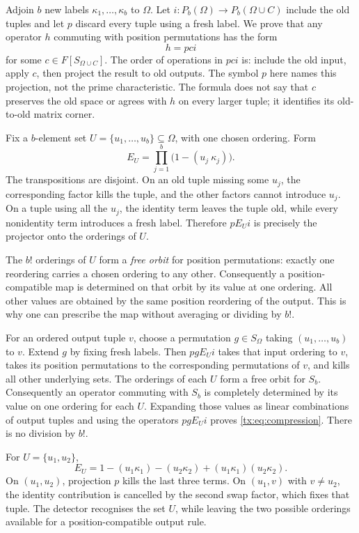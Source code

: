 Adjoin $b$ new labels $\kappa_1,\ldots,\kappa_b$ to $\Omega$. Let $i:P_b(\Omega)\to P_b(\Omega\cup C)$ include the old tuples and let $p$ discard every tuple using a fresh label. We prove that any operator $h$ commuting with position permutations has the form
\begin{equation}\label{tx:eq:compression}h=pci\end{equation}
for some $c\in F[S_{\Omega\cup C}]$.
The order of operations in $pci$ is: include the old input, apply
$c$, then project the result to old outputs. The symbol $p$ here
names this projection, not the prime characteristic. The formula
does not say that $c$ preserves the old space or agrees with $h$
on every larger tuple; it identifies its old-to-old matrix corner.

Fix a $b$-element set $U=\{u_1,\ldots,u_b\}\subseteq\Omega$, with one chosen ordering. Form
\[E_U=\prod_{j=1}^b\bigl(1-(u_j\ \kappa_j)\bigr).\]
The transpositions are disjoint. On an old tuple missing some $u_j$, the corresponding factor kills the tuple, and the other factors cannot introduce $u_j$. On a tuple using all the $u_j$, the identity term leaves the tuple old, while every nonidentity term introduces a fresh label. Therefore $pE_Ui$ is precisely the projector onto the orderings of $U$.

The $b!$ orderings of $U$ form a \emph{free orbit} for position
permutations: exactly one reordering carries a chosen ordering to
any other. Consequently a position-compatible map is determined
on that orbit by its value at one ordering. All other values are
obtained by the same position reordering of the output. This is
why one can prescribe the map without averaging or dividing by $b!$.

For an ordered output tuple $v$, choose a permutation $g\in S_\Omega$ taking $(u_1,\ldots,u_b)$ to $v$. Extend $g$ by fixing fresh labels. Then $pgE_Ui$ takes that input ordering to $v$, takes its position permutations to the corresponding permutations of $v$, and kills all other underlying sets. The orderings of each $U$ form a free orbit for $S_b$. Consequently an operator commuting with $S_b$ is completely determined by its value on one ordering for each $U$. Expanding those values as linear combinations of output tuples and using the operators $pgE_Ui$ proves \eqref{tx:eq:compression}. There is no division by $b!$.

\begin{example}
For $U=\{u_1,u_2\}$,
\[E_U=1-(u_1\kappa_1)-(u_2\kappa_2)+(u_1\kappa_1)(u_2\kappa_2).
\]
On $(u_1,u_2)$, projection $p$ kills the last three terms. On $(u_1,v)$ with $v\ne u_2$, the identity contribution is cancelled by the second swap factor, which fixes that tuple. The detector recognises the set $U$, while leaving the two possible orderings available for a position-compatible output rule.
\end{example}

